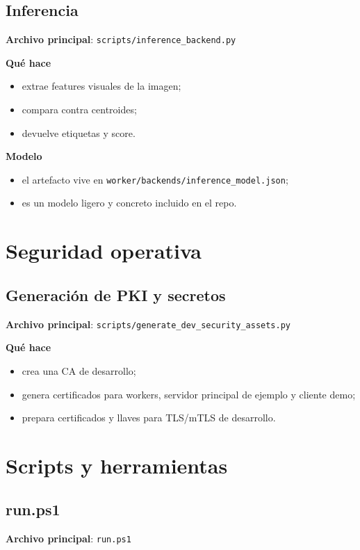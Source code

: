 \documentclass[11pt]{article}
\begin{document}
\subsection{Inferencia}
\textbf{Archivo principal}: \texttt{scripts/inference\_backend.py}

\textbf{Qué hace}
\begin{itemize}
\item extrae features visuales de la imagen;
\item compara contra centroides;
\item devuelve etiquetas y score.
\end{itemize}

\textbf{Modelo}
\begin{itemize}
\item el artefacto vive en \texttt{worker/backends/inference\_model.json};
\item es un modelo ligero y concreto incluido en el repo.
\end{itemize}

\section{Seguridad operativa}

\subsection{Generación de PKI y secretos}
\textbf{Archivo principal}: \texttt{scripts/generate\_dev\_security\_assets.py}

\textbf{Qué hace}
\begin{itemize}
\item crea una CA de desarrollo;
\item genera certificados para workers, servidor principal de ejemplo y cliente demo;
\item prepara certificados y llaves para TLS/mTLS de desarrollo.
\end{itemize}

\section{Scripts y herramientas}

\subsection{run.ps1}
\textbf{Archivo principal}: \texttt{run.ps1}
\end{document}
